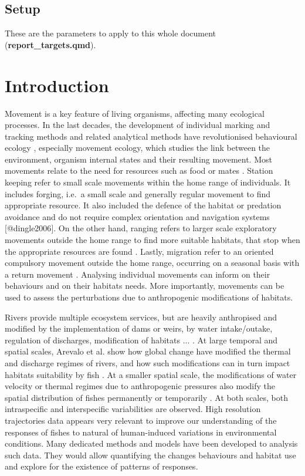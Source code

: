 \documentclass[
  letterpaper,
  DIV=11,
  numbers=noendperiod]{scrartcl}
\begin{document}
\hypertarget{setup}{%
\subsection{Setup}\label{setup}}

These are the parameters to apply to this whole document
(\textbf{report\_targets.qmd}).

\hypertarget{introduction}{%
\section{Introduction}\label{introduction}}

Movement is a key feature of living organisms, affecting many ecological
processes. In the last decades, the development of individual marking
and tracking methods and related analytical methods have revolutionised
behavioural ecology , especially movement ecology, which studies the
link between the environment, organism internal states and their
resulting movement. Most movements relate to the need for resources such
as food or mates . Station keeping refer to small scale movements within
the home range of individuals. It includes forging, i.e.~a small scale
and generally regular movement to find appropriate resource. It also
included the defence of the habitat or predation avoidance and do not
require complex orientation and navigation systems {[}@dingle2006{]}. On
the other hand, ranging refers to larger scale exploratory movements
outside the home range to find more suitable habitats, that stop when
the appropriate resources are found . Lastly, migration refer to an
oriented compulsory movement outside the home range, occurring on a
seasonal basis with a return movement . Analysing individual movements
can inform on their behaviours and on their habitats needs. More
importantly, movements can be used to assess the perturbations due to
anthropogenic modifications of habitats.

Rivers provide multiple ecosystem services, but are heavily anthropised
and modified by the implementation of dams or weirs, by water
intake/outake, regulation of discharges, modification of habitats ... .
At large temporal and spatial scales, Arevalo et al. show how global
change have modified the thermal and discharge regimes of rivers, and
how such modifications can in turn impact habitats suitability by fish .
At a smaller spatial scale, the modifications of water velocity or
thermal regimes due to anthropogenic pressures also modify the spatial
distribution of fishes permanently or temporarily . At both scales, both
intraspecific and interspecific variabilities are observed. High
resolution trajectories data appears very relevant to improve our
understanding of the responses of fishes to natural of human-induced
variations in environmental conditions. Many dedicated methods and
models have been developed to analysis such data. They would allow
quantifying the changes behaviours and habitat use and explore for the
existence of patterns of responses.
\end{document}
